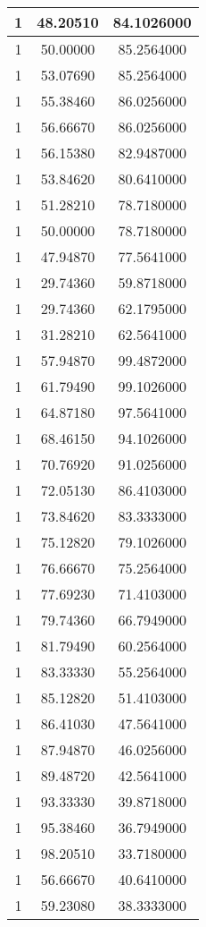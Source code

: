 \documentclass[
]{book}
\begin{document}
\begin{tabular}{c|c|c}
\hline
1 & 48.20510 & 84.1026000\\
\hline
1 & 50.00000 & 85.2564000\\
\hline
1 & 53.07690 & 85.2564000\\
\hline
1 & 55.38460 & 86.0256000\\
\hline
1 & 56.66670 & 86.0256000\\
\hline
1 & 56.15380 & 82.9487000\\
\hline
1 & 53.84620 & 80.6410000\\
\hline
1 & 51.28210 & 78.7180000\\
\hline
1 & 50.00000 & 78.7180000\\
\hline
1 & 47.94870 & 77.5641000\\
\hline
1 & 29.74360 & 59.8718000\\
\hline
1 & 29.74360 & 62.1795000\\
\hline
1 & 31.28210 & 62.5641000\\
\hline
1 & 57.94870 & 99.4872000\\
\hline
1 & 61.79490 & 99.1026000\\
\hline
1 & 64.87180 & 97.5641000\\
\hline
1 & 68.46150 & 94.1026000\\
\hline
1 & 70.76920 & 91.0256000\\
\hline
1 & 72.05130 & 86.4103000\\
\hline
1 & 73.84620 & 83.3333000\\
\hline
1 & 75.12820 & 79.1026000\\
\hline
1 & 76.66670 & 75.2564000\\
\hline
1 & 77.69230 & 71.4103000\\
\hline
1 & 79.74360 & 66.7949000\\
\hline
1 & 81.79490 & 60.2564000\\
\hline
1 & 83.33330 & 55.2564000\\
\hline
1 & 85.12820 & 51.4103000\\
\hline
1 & 86.41030 & 47.5641000\\
\hline
1 & 87.94870 & 46.0256000\\
\hline
1 & 89.48720 & 42.5641000\\
\hline
1 & 93.33330 & 39.8718000\\
\hline
1 & 95.38460 & 36.7949000\\
\hline
1 & 98.20510 & 33.7180000\\
\hline
1 & 56.66670 & 40.6410000\\
\hline
1 & 59.23080 & 38.3333000\\

\end{tabular}
\end{document}
